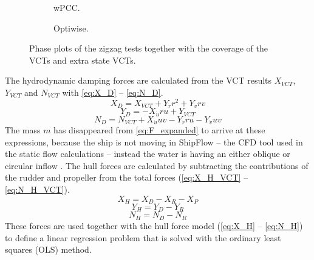 \begin{figure}[H]
     \centering
     \begin{subfigure}[b]{0.49\textwidth}
         \centering
         
        \caption{wPCC.}
        \label{fig:VCT_phase_plot_wPCC}
     \end{subfigure}
     \hfill
     \begin{subfigure}[b]{0.49\textwidth}
        \centering
        
        \caption{Optiwise.}
        \label{fig:VCT_phase_plot_optiwise}
     \end{subfigure}
        \caption{Phase plots of the zigzag tests together with the coverage of the VCTs and extra state VCTs.}
        \label{fig:phase_plots}
\end{figure}

The hydrodynamic damping forces are calculated from the VCT results $X_{VCT}$, $Y_{VCT}$ and $N_{VCT}$
with \autoref{eq:X_D} -- \autoref{eq:N_D}.
\begin{equation}
    \label{eq:X_D}
    X_{D} = X_{VCT} + Y_{\dot{r}} r^{2} + Y_{\dot{v}} r v
\end{equation}
\begin{equation}
    \label{eq:Y_D}
    Y_{D} = - X_{\dot{u}} r u + Y_{VCT}
\end{equation}
\begin{equation}
    \label{eq:N_D}
    N_{D} = N_{VCT} + X_{\dot{u}} u v - Y_{\dot{r}} r u - Y_{\dot{v}} u v
\end{equation}
The mass $m$ has disappeared from \autoref{eq:F_expanded} to arrive at these expressions, because the ship is not moving in ShipFlow -- the CFD tool used in the static flow calculations -- instead the water is having an either oblique or circular inflow \cite{roychoudhury_cfd_2017}.
The hull forces are calculated by subtracting the contributions of the rudder and propeller from the total forces (\autoref{eq:X_H_VCT} -- \autoref{eq:N_H_VCT}).
\begin{equation}
    \label{eq:X_H_VCT}
    X_H = X_D - X_R - X_P
\end{equation}
\begin{equation}
    \label{eq:Y_H_VCT}
    Y_H = Y_D - Y_R
\end{equation}
\begin{equation}
    \label{eq:N_H_VCT}
    N_H = N_D - N_R
\end{equation}
These forces are used together with the hull force model (\autoref{eq:X_H} -- \autoref{eq:N_H}) to define a linear regression problem that is solved with the ordinary least squares (OLS) method. 